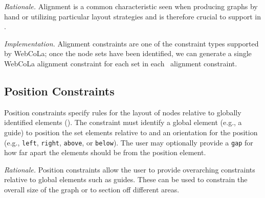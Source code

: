 \emph{Rationale.} Alignment is a common characteristic seen when producing
graphs by hand  or utilizing particular layout strategies
 and is therefore crucial to support in \projectname.


\emph{Implementation.}
Alignment constraints are one of the constraint types supported by WebCoLa;
once the node sets have been identified, we can generate a single WebCoLa
alignment constraint for each set in each \projectname\ alignment constraint.


\subsection{Position Constraints}
 Position constraints specify rules for the layout
of nodes relative to globally identified elements (). The
constraint must identify a global element (e.g., a guide) to position the
set elements relative to and an orientation for the position (e.g.,
\texttt{left}, \texttt{right}, \texttt{above}, or \texttt{below}). The user
may optionally provide a \texttt{gap} for how far apart the elements should
be from the position element.

\emph{Rationale.} Position constraints allow the user to provide
overarching constraints relative to global elements such as guides. These
can be used to constrain the overall size of the graph or to section off
different areas. 


